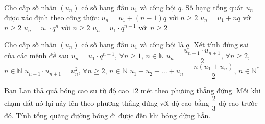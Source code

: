 \begin{ex}%
	Cho cấp số nhân $(u_n)$ có số hạng đầu $u_1$ và công bội $q$. Số hạng tổng quát $u_n$ được xác định theo công  thức:
	\choice 
		{$u_n=u_1+(n-1)q$ với $n  \ge 2$}
		{$u_n=u_1+nq$ với $n \ge  2$}
		{$u_n=u_1 \cdot q^n$ với $n \ge  2$}
		{\True  $u_n=u_1 \cdot q^{n-1}$ với $n \ge 2$}
\end{ex}



\begin{ex}%
	Cho cấp số nhân $\left(u_n\right)$ có số hạng đầu $u_1$ và công bội là $q$. Xét tính đúng sai của các  mệnh đề sau
	 \choiceTF
		{\True $u_n=u_1 \cdot q^{n-1}$,  $\forall n \geq 1$, $n \in \mathbb{N}$}
		{$u_n=\dfrac{u_{n-1} \cdot u_{n+1}}{2}$, $\forall n \geq 2$,  $n \in \mathbb{N}$}
		{\True $u_{n-1}\cdot u_{n+1}=u_n^2$, $\forall n \geq 2$, $n  \in \mathbb{N}$}
		{$u_1+u_2+\ldots+u_n=\dfrac{n\left(u_1+u_n\right)}{2}$, $n \in \mathbb{N}^*$} 
\end{ex}



\begin{ex}%
	Bạn Lan thả quả bóng cao su từ độ cao $12$ mét theo phương thẳng đứng. Mỗi khi chạm đất nó lại nảy lên  theo phương thẳng đứng với độ cao bằng $\dfrac{2}{3}$ độ cao trước đó. Tính tổng quãng đường bóng đi được đến khi bóng dừng hẳn.
\end{ex}

